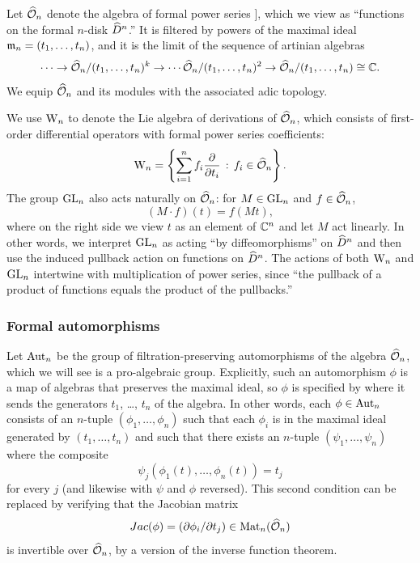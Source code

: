 Let $\widehat{\mathcal O}_n$ denote the algebra of formal power series 
\ben
\CC [[ t_1,\ldots,t_n ]],
\een 
which we view as ``functions on the formal $n$-disk $\widehat{D}^n$.'' 
It is filtered by powers of the maximal ideal ${\mathfrak m}_n = (t_1,\ldots,t_n)$, and it is the limit of the sequence of artinian algebras
\[
\cdots \to \widehat{\mathcal O}_n/(t_1,\ldots,t_n)^k \to \cdots \widehat{\mathcal O}_n/(t_1,\ldots,t_n)^2 \to \widehat{\mathcal O}_n/(t_1,\ldots,t_n) \cong \mathbb C.
\] 
We equip $\widehat{\mathcal O}_n$ and its modules with the associated adic topology.

We use ${{\rm W}_n}$ to denote the Lie algebra of derivations of $\widehat{\mathcal O}_n$, which consists of first-order differential operators with formal power series coefficients:
\[
{{\rm W}_n} = \left\{ \sum_{i =1 }^n f_i \frac{\partial}{\partial t_i} \,:\, f_i \in \widehat{\mathcal O}_n\right\}.
\]
The group ${\rm GL}_n$ also acts naturally on $\widehat{\mathcal O}_n$: for $M \in {\rm GL}_n$ and $f \in \widehat{\mathcal O}_n$,
\[
(M \cdot f)(t) = f (Mt),
\]
where on the right side we view $t$ as an element of $\mathbb C^n$ and let $M$ act linearly.
In other words, we interpret ${\rm GL}_n$ as acting ``by diffeomorphisms'' on $\widehat{D}^n$ and then use the induced pullback action on functions on $\widehat{D}^n$.
The actions of both ${{\rm W}_n}$ and ${\rm GL}_n$ intertwine with multiplication of power series, 
since ``the pullback of a product of functions equals the product of the pullbacks.''

\subsubsection{Formal automorphisms}

Let ${\rm Aut}_n$ be the group of filtration-preserving automorphisms of the algebra $\widehat{\mathcal O}_n$,
which we will see is a pro-algebraic group.
Explicitly, such an automorphism $\phi$ is a map of algebras that preserves the maximal ideal, 
so $\phi$ is specified by where it sends the generators $t_1$, \dots, $t_n$ of the algebra.
In other words, each $\phi \in {\rm Aut}_n$ consists of an $n$-tuple $(\phi_1,\ldots,\phi_n)$ 
such that each $\phi_i$ is in the maximal ideal generated by $(t_1,\ldots,t_n)$ and such that there exists an $n$-tuple $(\psi_1,\ldots,\psi_n)$ 
where the composite
\[
\psi_j(\phi_1(t),\ldots,\phi_n(t)) = t_j
\]
for every $j$ (and likewise with $\psi$ and $\phi$ reversed).
This second condition can be replaced by verifying that the Jacobian matrix
\[
Jac(\phi) = (\partial \phi_i/\partial t_j) \in {\rm Mat}_n(\widehat{\mathcal O}_n)
\]
is invertible over $\widehat{\mathcal O}_n$, by a version of the inverse function theorem.

